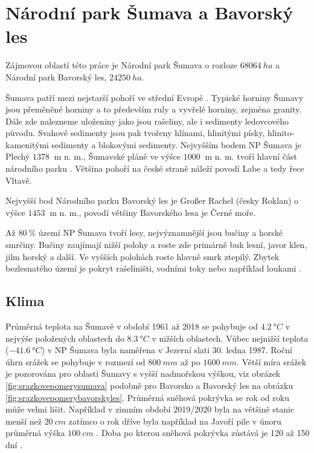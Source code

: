 \section{Národní park Šumava a Bavorský les} \label{chap:sumavabavorskyles}
Zájmovou oblastí této práce je Národní park Šumava o rozloze $\SI{68 064}{ha}$ \parencite{npsumava} a Národní park Bavorský les, $\SI{24 250}{ha}$.

Šumava patří mezi nejstarší pohoří ve střední Evropě \parencite{WildJan2004Cops}. Typické horniny Šumavy jsou přeměněné horniny a to především ruly a vyvřelé horniny, zejména granity. Dále zde nalezneme uloženiny jako jsou rašeliny, ale i sedimenty ledovcového původu. Svahové sedimenty jsou pak tvořeny hlínami, hlinitými písky, hlinito-kamenitými sedimenty a blokovými sedimenty. Nejvyšším bodem NP Šumava je Plechý $\SI{1378}{}$ m n. m., Šumavské pláně ve výšce $\SI{1000}{}$ m n. m. tvoří hlavní část národního parku \parencite{npsumava}. Většina pohoří na české straně náleží povodí Labe a tedy řece Vltavě.

Nejvyšší bod Národního parku Bavorský les je Großer Rachel (česky Roklan) o výšce $\SI{1453}{}$ m n. m., povodí většiny Bavorského lesa je Černé moře.

Až $\SI{80}{\%}$ území NP Šumava tvoří lesy, nejvýznamnější jsou bučiny a horské smrčiny. Bučiny zaujímají nižší polohy a roste zde primárně buk lesní, javor klen, jilm horský a další. Ve vyšších polohách roste hlavně smrk ztepilý. Zbytek bezlesnatého území je pokryt rašeliništi, vodními toky nebo například loukami \parencite{vegetacesumava}.

\subsection{Klima}
Průměrná teplota na Šumavě v období 1961 až 2018 se pohybuje od $\SI{4.2}{\degree C}$ v nejvýše položených oblastech do $\SI{8.3}{\degree C}$ v nižších oblastech. Vůbec nejnižší teplota ($\SI{-41.6}{\degree C}$) v NP Šumava byla naměřena v Jezerní slati 30. ledna 1987. Roční úhrn srážek se pohybuje v rozmezí od $\SI{800}{mm}$ až po $\SI{1600}{mm}$. Větší míra srážek je pozorována pro oblasti Šumavy s vyšší nadmořskou výškou, viz obrázek \ref{fig:srazkovepomerysumava} podobně pro Bavorsko a Bavorský les na obrázku \ref{fig:srazkovepomerybavorskyles}. Průměrná sněhová pokrývka se rok od roku může velmi lišit. Například v zimním období 2019/2020 byla na většině stanic menší než $\SI{20}{cm}$ zatímco o rok dříve byla například na Javoří pile v únoru průměrná výška $\SI{100}{cm}$ \parencite{meansnowsumava}. Doba po kterou sněhová pokrývka zůstává je 120 až 150 dní \parencite{npsumava}.

